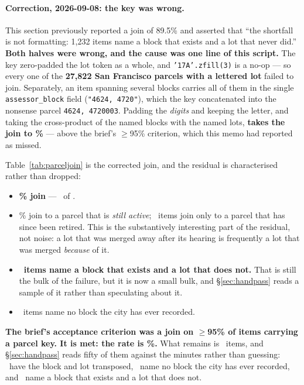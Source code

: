 \documentclass[11pt]{article}
\begin{document}
\paragraph{Correction, 2026-09-08: the key was wrong.} This section previously reported a
join of 89.5\% and asserted that ``the shortfall is not formatting: 1{,}232 items name a block
that exists and a lot that never did.'' \textbf{Both halves were wrong, and the cause was one
line of this script.} The key zero-padded the lot token as a whole, and
\texttt{'17A'.zfill(3)} is a no-op --- so every one of the \textbf{27{,}822 San Francisco
parcels with a lettered lot} failed to join. Separately, an item spanning several blocks
carries all of them in the single \texttt{assessor\_block} field
(\texttt{"4624, 4720"}), which the key concatenated into the nonsense parcel
\texttt{4624, 4720003}. Padding the \emph{digits} and keeping the letter, and taking the
cross-product of the named blocks with the named lots, \textbf{takes the join to
\acqParcelJoin\%} --- above the brief's $\geq$95\% criterion, which this memo had reported as
missed.

Table~\ref{tab:parceljoin} is the corrected join, and the residual is characterised rather
than dropped:

\begin{itemize}
\item \textbf{\acqParcelJoin\% join} --- \acqParcelJoinN\ of \acqWithParcel.
\item \acqParcelActive\% join to a parcel that is \emph{still active}; \acqParcelRetired\
items join only to a parcel that has since been retired. This is the substantively
interesting part of the residual, not noise: a lot that was merged away after its hearing is
frequently a lot that was merged \emph{because} of it.
\item \textbf{\acqParcelNoLot\ items name a block that exists and a lot that does not.} That
is still the bulk of the failure, but it is now a small bulk, and \S\ref{sec:handpass} reads a
sample of it rather than speculating about it.
\item \acqParcelNoBlock\ items name no block the city has ever recorded.
\end{itemize}

\textbf{The brief's acceptance criterion was a join on $\geq$95\% of items carrying a parcel
key. It is met: the rate is \acqParcelJoin\%.} What remains is \acqHandResidual\ items, and
\S\ref{sec:handpass} reads fifty of them against the minutes rather than guessing:
\acqHandTransposed\ have the block and lot transposed, \acqHandNoBlock\ name no block the city
has ever recorded, and \acqHandBlockOnly\ name a block that exists and a lot that does not.
\end{document}
